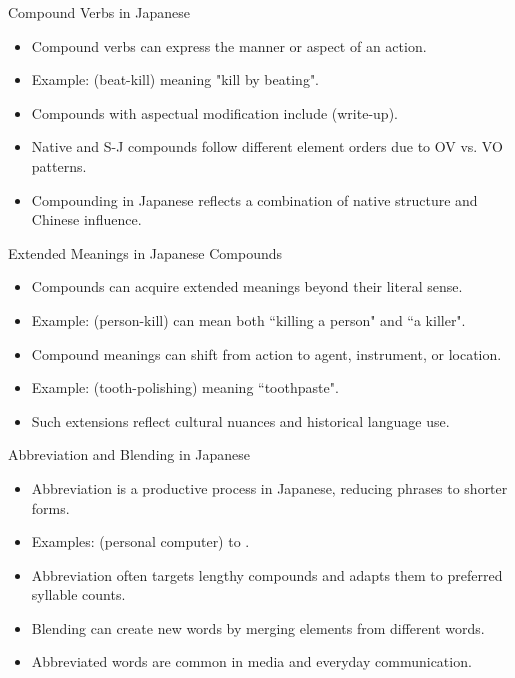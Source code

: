 \documentclass{beamer}
\begin{document}
\begin{frame}{Compound Verbs in Japanese}
    \begin{itemize}
        \item Compound verbs can express the manner or aspect of an action.
        \item Example:  (beat-kill) meaning "kill by beating".
        \item Compounds with aspectual modification include  (write-up).
        \item Native and S-J compounds follow different element orders due to OV vs. VO patterns.
        \item Compounding in Japanese reflects a combination of native structure and Chinese influence.
    \end{itemize}
\end{frame}

\begin{frame}{Extended Meanings in Japanese Compounds}
    \begin{itemize}
        \item Compounds can acquire extended meanings beyond their literal sense.
        \item Example:  (person-kill) can mean both ``killing a person" and ``a killer".
        \item Compound meanings can shift from action to agent, instrument, or location.
        \item Example:  (tooth-polishing) meaning ``toothpaste".
        \item Such extensions reflect cultural nuances and historical language use.
    \end{itemize}
\end{frame}

\begin{frame}{Abbreviation and Blending in Japanese}
    \begin{itemize}
        \item Abbreviation is a productive process in Japanese, reducing phrases to shorter forms.
        \item Examples:  (personal computer) to .
        \item Abbreviation often targets lengthy compounds and adapts them to preferred syllable counts.
        \item Blending can create new words by merging elements from different words.
        \item Abbreviated words are common in media and everyday communication.
    \end{itemize}
\end{frame}
\end{document}
